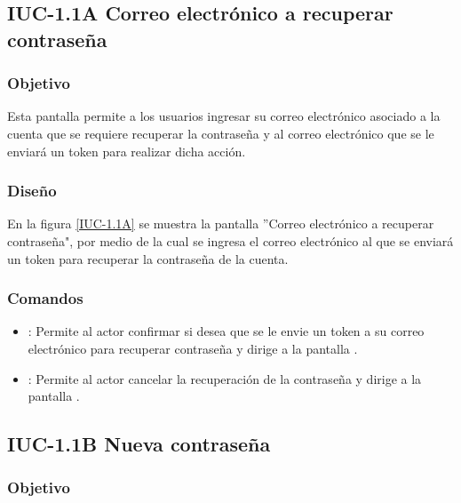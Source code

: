 \subsection{IUC-1.1A Correo electrónico a recuperar contraseña}

\subsubsection{Objetivo}
	
Esta pantalla permite a los usuarios ingresar su correo electrónico asociado a la cuenta que se requiere recuperar la contraseña y al correo electrónico que se le enviará un token para realizar dicha acción.

\subsubsection{Diseño}

    En la figura \ref{IUC-1.1A} se muestra la pantalla ''Correo electrónico a recuperar contraseña", por medio de la cual se ingresa el correo electrónico al que se enviará un token para recuperar la contraseña de la cuenta. 
 

\subsubsection{Comandos}
    \begin{itemize}
	\item {}: Permite al actor confirmar si desea que se le envie un token a su correo electrónico para recuperar contraseña y dirige a la pantalla .
	\item {}: Permite al actor cancelar la recuperación de la contraseña y dirige a la pantalla .
    \end{itemize}



\subsection{IUC-1.1B Nueva contraseña}

\subsubsection{Objetivo}

